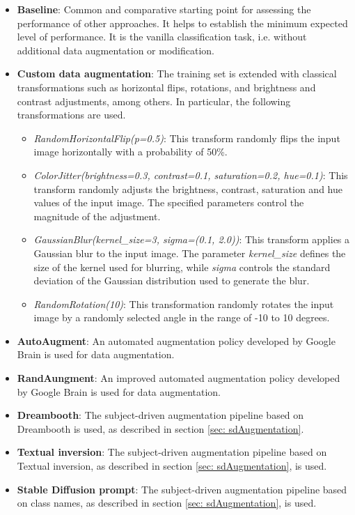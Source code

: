 \begin{itemize}
    \item \textbf{Baseline}: Common and comparative starting point for assessing the performance of other approaches. It helps to establish the minimum expected level of performance. It is the vanilla classification task, i.e. without additional data augmentation or modification.
    \item \textbf{Custom data augmentation}: The training set is extended with classical transformations such as horizontal flips, rotations, and brightness and contrast adjustments, among others. In particular, the following transformations are used.
    \begin{itemize}
        \item \textit{RandomHorizontalFlip(p=0.5)}: This transform randomly flips the input image horizontally with a probability of 50\%.
        \item \textit{ColorJitter(brightness=0.3, contrast=0.1, saturation=0.2, hue=0.1)}: This transform randomly adjusts the brightness, contrast, saturation and hue values of the input image. The specified parameters control the magnitude of the adjustment.
        \item \textit{GaussianBlur(kernel\_size=3, sigma=(0.1, 2.0))}: This transform applies a Gaussian blur to the input image. The parameter \textit{kernel\_size} defines the size of the kernel used for blurring, while \textit{sigma} controls the standard deviation of the Gaussian distribution used to generate the blur.
        \item \textit{RandomRotation(10)}: This transformation randomly rotates the input image by a randomly selected angle in the range of -10 to 10 degrees.
    \end{itemize}
    \item \textbf{AutoAugment}: An automated augmentation policy developed by Google Brain \cite{cubuk2018autoaugment} is used for data augmentation.
    \item \textbf{RandAungment}: An improved automated augmentation policy developed by Google Brain \cite{cubuk2020randaugment} is used for data augmentation.
    \item \textbf{Dreambooth}: The subject-driven augmentation pipeline based on Dreambooth is used, as described in section \ref{sec: sdAugmentation}. 
    \item \textbf{Textual inversion}: The subject-driven augmentation pipeline based on Textual inversion, as described in section \ref{sec: sdAugmentation}, is used.
    \item \textbf{Stable Diffusion prompt}: The subject-driven augmentation pipeline based on class names, as described in section \ref{sec: sdAugmentation}, is used.
\end{itemize}

